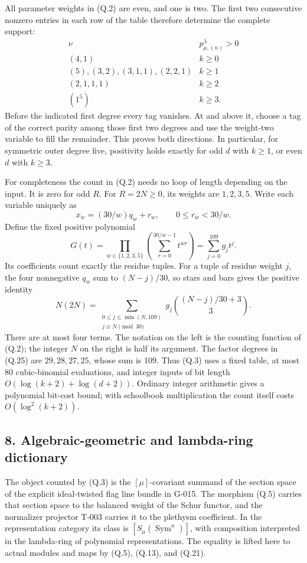 \documentclass[
  10pt,
]{article}
\begin{document}
All parameter weights in (Q.2) are even, and one is two. The first two
consecutive nonzero entries in each row of the table therefore determine
the complete support: \[
\begin{array}{c|c}
\nu& p_{\mu,(n)}^\lambda>0\\\hline
(4,1)&k\ge0\\
(5),(3,2),(3,1,1),(2,2,1)&k\ge1\\
(2,1,1,1)&k\ge2\\
(1^5)&k\ge3.
\end{array}
\tag{Q.24}
\] Before the indicated first degree every tag vanishes. At and above
it, choose a tag of the correct parity among those first two degrees and
use the weight-two variable to fill the remainder. This proves both
directions. In particular, for symmetric outer degree five, positivity
holds exactly for odd \(d\) with \(k\ge1\), or even \(d\) with
\(k\ge3\).

For completeness the count in (Q.2) needs no loop of length depending on
the input. It is zero for odd \(R\). For \(R=2N\ge0\), its weights are
\(1,2,3,5\). Write each variable uniquely as \[
x_w=(30/w)q_w+r_w,\qquad0\le r_w<30/w.
\] Define the fixed positive polynomial \[
G(t)=\prod_{w\in\{1,2,3,5\}}
\left(\sum_{r=0}^{30/w-1}t^{wr}\right)
=\sum_{j=0}^{109}g_jt^j.
\tag{Q.25}
\] Its coefficients count exactly the residue tuples. For a tuple of
residue weight \(j\), the four nonnegative \(q_w\) sum to \((N-j)/30\),
so stars and bars gives the positive identity \[
N(2N)=
\sum_{\substack{0\le j\le\min(N,109)\\j\equiv N\pmod{30}}}
g_j\binom{(N-j)/30+3}{3}.
\tag{Q.26}
\] There are at most four terms. The notation on the left is the
counting function of (Q.2); the integer \(N\) on the right is half its
argument. The factor degrees in (Q.25) are \(29,28,27,25\), whose sum is
109. Thus (Q.3) uses a fixed table, at most 80 cubic-binomial
evaluations, and integer inputs of bit length
\(O(\log(k+2)+\log(d+2))\). Ordinary integer arithmetic gives a
polynomial bit-cost bound; with schoolbook multiplication the count
itself costs \(O(\log^2(k+2))\).

\subsection{8. Algebraic-geometric and lambda-ring
dictionary}\label{algebraic-geometric-and-lambda-ring-dictionary}

The object counted by (Q.3) is the \([\mu]\)-covariant summand of the
section space of the explicit ideal-twisted flag line bundle in G-015.
The morphism (Q.5) carries that section space to the balanced weight of
the Schur functor, and the normalizer projector T-003 carries it to the
plethysm coefficient. In the representation category its class is
\([S_\mu(\operatorname{Sym}^n)]\), with composition interpreted in the
lambda-ring of polynomial representations. The equality is lifted here
to actual modules and maps by (Q.5), (Q.13), and (Q.21).
\end{document}
